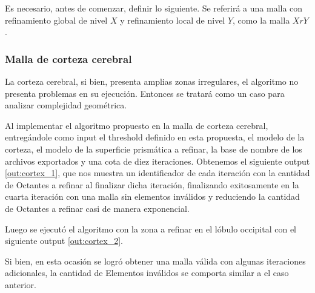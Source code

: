 Es necesario, antes de comenzar, definir lo siguiente. Se referirá a una malla con refinamiento global de nivel $X$ y refinamiento local de nivel $Y$, como la malla $XrY$.

\subsubsection{Malla de corteza cerebral}

La corteza cerebral, si bien, presenta amplias zonas irregulares, el algoritmo no presenta problemas en su ejecución. Entonces se tratará como un caso para analizar complejidad geométrica.

Al implementar el algoritmo propuesto en la malla de corteza cerebral, entregándole como input el threshold definido en esta propuesta, el modelo de la corteza, el modelo de la superficie prismática a refinar, la base de nombre de los archivos exportados y una cota de diez iteraciones.  Obtenemos el siguiente output \ref{out:cortex_1}, que nos muestra un identificador de cada iteración con la cantidad de Octantes a refinar al finalizar dicha iteración, finalizando exitosamente en la cuarta iteración con una malla sin elementos inválidos y reduciendo la cantidad de Octantes a refinar casi de manera exponencial.

Luego se ejecutó el algoritmo con la zona a refinar en el lóbulo occipital con el siguiente output \ref{out:cortex_2}.

Si bien, en esta ocasión se logró obtener una malla válida con algunas iteraciones adicionales, la cantidad de Elementos inválidos se comporta similar a el caso anterior.


